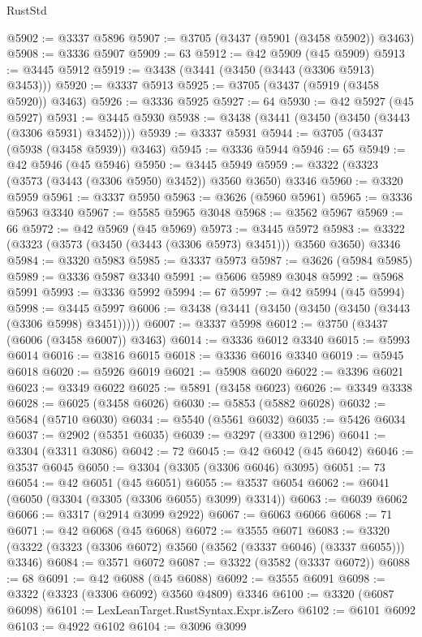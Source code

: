 \begin{lexlean}{RustStd}
\begin{coremodule}
@5902 := @3337 @5896
@5907 := @3705 (@3437 (@5901 (@3458 @5902)) @3463)
@5908 := @3336 @5907
@5909 := 63
@5912 := @42 @5909 (@45 @5909)
@5913 := @3445 @5912
@5919 := @3438 (@3441 (@3450 (@3443 (@3306 @5913) @3453)))
@5920 := @3337 @5913
@5925 := @3705 (@3437 (@5919 (@3458 @5920)) @3463)
@5926 := @3336 @5925
@5927 := 64
@5930 := @42 @5927 (@45 @5927)
@5931 := @3445 @5930
@5938 := @3438 (@3441 (@3450 (@3450 (@3443 (@3306 @5931) @3452))))
@5939 := @3337 @5931
@5944 := @3705 (@3437 (@5938 (@3458 @5939)) @3463)
@5945 := @3336 @5944
@5946 := 65
@5949 := @42 @5946 (@45 @5946)
@5950 := @3445 @5949
@5959 := @3322 (@3323 (@3573 (@3443 (@3306 @5950) @3452)) @3560 @3650) @3346
@5960 := @3320 @5959
@5961 := @3337 @5950
@5963 := @3626 (@5960 @5961)
@5965 := @3336 @5963 @3340
@5967 := @5585 @5965 @3048
@5968 := @3562 @5967
@5969 := 66
@5972 := @42 @5969 (@45 @5969)
@5973 := @3445 @5972
@5983 := @3322 (@3323 (@3573 (@3450 (@3443 (@3306 @5973) @3451))) @3560 @3650) @3346
@5984 := @3320 @5983
@5985 := @3337 @5973
@5987 := @3626 (@5984 @5985)
@5989 := @3336 @5987 @3340
@5991 := @5606 @5989 @3048
@5992 := @5968 @5991
@5993 := @3336 @5992
@5994 := 67
@5997 := @42 @5994 (@45 @5994)
@5998 := @3445 @5997
@6006 := @3438 (@3441 (@3450 (@3450 (@3450 (@3443 (@3306 @5998) @3451)))))
@6007 := @3337 @5998
@6012 := @3750 (@3437 (@6006 (@3458 @6007)) @3463)
@6014 := @3336 @6012 @3340
@6015 := @5993 @6014
@6016 := @3816 @6015
@6018 := @3336 @6016 @3340
@6019 := @5945 @6018
@6020 := @5926 @6019
@6021 := @5908 @6020
@6022 := @3396 @6021
@6023 := @3349 @6022
@6025 := @5891 (@3458 @6023)
@6026 := @3349 @3338
@6028 := @6025 (@3458 @6026)
@6030 := @5853 (@5882 @6028)
@6032 := @5684 (@5710 @6030)
@6034 := @5540 (@5561 @6032)
@6035 := @5426 @6034
@6037 := @2902 (@5351 @6035)
@6039 := @3297 (@3300 @1296)
@6041 := @3304 (@3311 @3086)
@6042 := 72
@6045 := @42 @6042 (@45 @6042)
@6046 := @3537 @6045
@6050 := @3304 (@3305 (@3306 @6046) @3095)
@6051 := 73
@6054 := @42 @6051 (@45 @6051)
@6055 := @3537 @6054
@6062 := @6041 (@6050 (@3304 (@3305 (@3306 @6055) @3099) @3314))
@6063 := @6039 @6062
@6066 := @3317 (@2914 @3099 @2922)
@6067 := @6063 @6066
@6068 := 71
@6071 := @42 @6068 (@45 @6068)
@6072 := @3555 @6071
@6083 := @3320 (@3322 (@3323 (@3306 @6072) @3560 (@3562 (@3337 @6046) (@3337 @6055))) @3346)
@6084 := @3571 @6072
@6087 := @3322 (@3582 (@3337 @6072))
@6088 := 68
@6091 := @42 @6088 (@45 @6088)
@6092 := @3555 @6091
@6098 := @3322 (@3323 (@3306 @6092) @3560 @4809) @3346
@6100 := @3320 (@6087 @6098)
@6101 := LexLeanTarget.RustSyntax.Expr.isZero
@6102 := @6101 @6092
@6103 := @4922 @6102
@6104 := @3096 @3099

\end{coremodule}
\end{lexlean}
